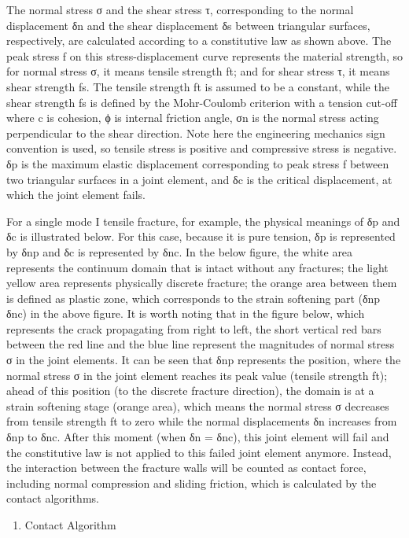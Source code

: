 \documentclass[format=acmtog, 12pt, screen=true, review=false]{acmart}
\begin{document}
\bigbreak
The normal stress σ and the shear stress τ, corresponding to the normal displacement δn and the shear displacement δs between triangular surfaces, respectively, are calculated according to a constitutive law as shown above. The peak stress f on this stress-displacement curve represents the material strength, so for normal stress σ, it means tensile strength ft; and for shear stress τ, it means shear strength fs. The tensile strength ft is assumed to be a constant, while the shear strength fs is defined by the Mohr-Coulomb criterion with a tension cut-off where c is cohesion,  ϕ is internal friction angle, σn is the normal stress acting perpendicular to the shear direction. Note here the engineering mechanics sign convention is used, so tensile stress is positive and compressive stress is negative. δp is the maximum elastic displacement corresponding to peak stress f between two triangular surfaces in a joint element, and δc is the critical displacement, at which the joint element fails.

For a single mode I tensile fracture, for example, the physical meanings of δp and δc is illustrated below. For this case, because it is pure tension, δp is represented by δnp and δc is represented by δnc. In the below figure, the white area represents the continuum domain that is intact without any fractures; the light yellow area represents physically discrete fracture; the orange area between them is defined as plastic zone, which corresponds to the strain softening part (δnp ~ δnc) in the above figure. It is worth noting that in the figure below, which represents the crack propagating from right to left, the short vertical red bars between the red line and the blue line represent the magnitudes of normal stress σ in the joint elements. It can be seen that δnp represents the position, where the normal stress σ in the joint element reaches its peak value (tensile strength ft); ahead of this position (to the discrete fracture direction), the domain is at a strain softening stage (orange area), which means the normal stress σ decreases from tensile strength ft to zero while the normal displacements δn increases from δnp to δnc. After this moment (when δn = δnc), this joint element will fail and the constitutive law is not applied to this failed joint element anymore. Instead, the interaction between the fracture walls will be counted as contact force, including normal compression and sliding friction, which is calculated by the contact algorithms. 

\begin{enumerate}
    \item Contact Algorithm \cite{Mun04}
\end{enumerate}
\end{document}
